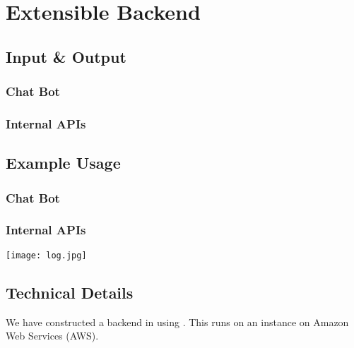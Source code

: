 \section{Extensible Backend}
\subsection{Input \& Output}
\subsubsection{Chat Bot}

\subsubsection{Internal APIs}

\subsection{Example Usage}
\subsubsection{Chat Bot}


\subsubsection{Internal APIs}
\texttt{[image: log.jpg]}

\subsection{Technical Details}
 We have constructed a backend in  using . This runs on an  instance on Amazon Web Services (AWS). 
\newpage
